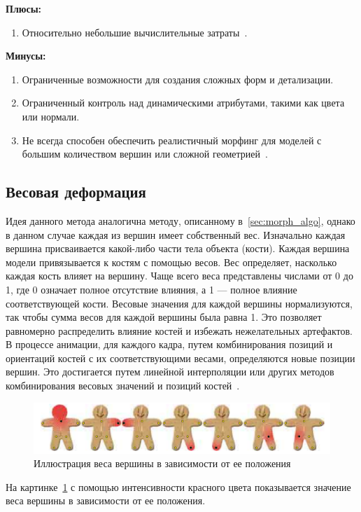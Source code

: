 \newpage

\textbf{Плюсы:}
\begin{enumerate}
	\item Относительно небольшие вычислительные затраты~\cite{morphing_methods}.
\end{enumerate}

\textbf{Минусы:}
\begin{enumerate}
	\item Ограниченные возможности для создания сложных форм и детализации.
	\item Ограниченный контроль над динамическими атрибутами, такими как цвета или нормали.
	\item Не всегда способен обеспечить реалистичный морфинг для моделей с большим количеством вершин или сложной геометрией~\cite{morphing_methods}.
\end{enumerate}


\subsection{Весовая деформация}
Идея данного метода аналогична методу, описанному в~\ref{sec:morph_algo}, однако в данном случае каждая из вершин имеет собственный вес.
Изначально каждая вершина присваивается какой-либо части тела объекта (кости). 
Каждая вершина модели привязывается к костям с помощью весов. 
Вес определяет, насколько каждая кость влияет на вершину. 
Чаще всего веса представлены числами от 0 до 1, где 0 означает полное отсутствие влияния, а 1 --- полное влияние соответствующей кости. 
Весовые значения для каждой вершины нормализуются, так чтобы сумма весов для каждой вершины была равна 1. 
Это позволяет равномерно распределить влияние костей и избежать нежелательных артефактов. 
В процессе анимации, для каждого кадра, путем комбинирования позиций и ориентаций костей с их соответствующими весами, определяются новые позиции вершин.
Это достигается путем линейной интерполяции или других методов комбинирования весовых значений и позиций костей~\cite{weight_morphing}.

\begin{figure}[h]
	\centering
	\includegraphics[scale=0.8]{images/stickman_weights.png}
	\caption{Иллюстрация веса вершины в зависимости от ее положения}
	\label{fig:stickman_weights}
\end{figure}
На картинке~\ref{fig:stickman_weights} с помощью интенсивности красного цвета показывается значение веса вершины в зависимости от ее положения.

